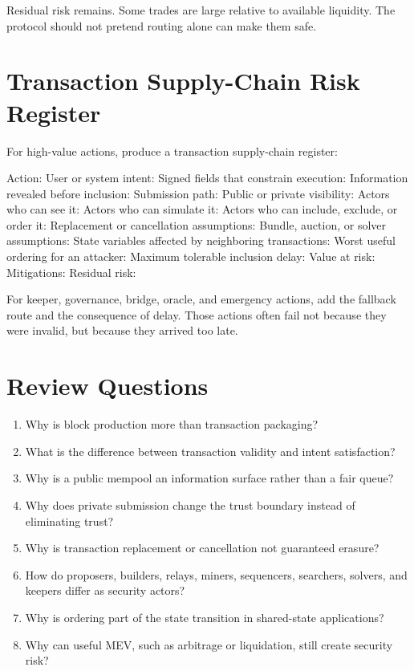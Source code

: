 Residual risk remains. Some trades are large relative to available liquidity. The protocol should not pretend routing alone can make them safe.

\section{Transaction Supply-Chain Risk Register}

For high-value actions, produce a transaction supply-chain register:

\begin{codeblock}
Action:
User or system intent:
Signed fields that constrain execution:
Information revealed before inclusion:
Submission path:
Public or private visibility:
Actors who can see it:
Actors who can simulate it:
Actors who can include, exclude, or order it:
Replacement or cancellation assumptions:
Bundle, auction, or solver assumptions:
State variables affected by neighboring transactions:
Worst useful ordering for an attacker:
Maximum tolerable inclusion delay:
Value at risk:
Mitigations:
Residual risk:
\end{codeblock}

For keeper, governance, bridge, oracle, and emergency actions, add the fallback route and the consequence of delay. Those actions often fail not because they were invalid, but because they arrived too late.

\section*{Review Questions}

\begin{enumerate}
\item Why is block production more than transaction packaging?
\item What is the difference between transaction validity and intent satisfaction?
\item Why is a public mempool an information surface rather than a fair queue?
\item Why does private submission change the trust boundary instead of eliminating trust?
\item Why is transaction replacement or cancellation not guaranteed erasure?
\item How do proposers, builders, relays, miners, sequencers, searchers, solvers, and keepers differ as security actors?
\item Why is ordering part of the state transition in shared-state applications?
\item Why can useful MEV, such as arbitrage or liquidation, still create security risk?
\end{enumerate}

